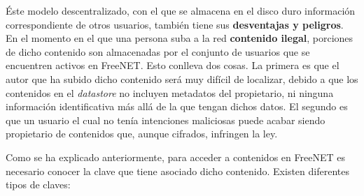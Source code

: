 Éste modelo descentralizado, con el que se almacena en el disco duro
información correspondiente de otros usuarios, también tiene sus
\textbf{desventajas y peligros}. En el momento en el que una persona
suba a la red \textbf{contenido ilegal}, porciones de dicho contenido
son almacenadas por el conjunto de usuarios que se encuentren activos
en FreeNET. Esto conlleva dos cosas.  La primera es que el autor que
ha subido dicho contenido será muy difícil de localizar, debido a que
los contenidos en el \textit{datastore} no incluyen metadatos del
propietario, ni ninguna información identificativa más allá de la que
tengan dichos datos.  El segundo es que un usuario el cual no tenía
intenciones maliciosas puede acabar siendo propietario de contenidos
que, aunque cifrados, infringen la ley.

Como se ha explicado anteriormente, para acceder a contenidos en FreeNET es necesario conocer la clave que tiene asociado dicho contenido. Existen diferentes tipos de claves:

